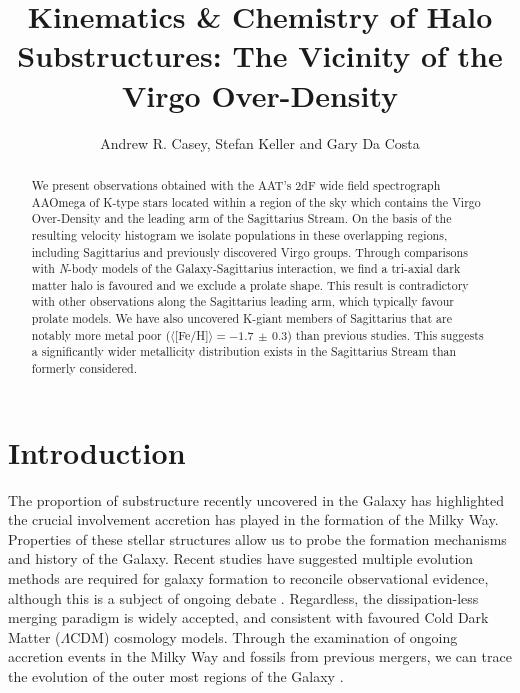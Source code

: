 \documentclass[preprint2]{aastex}
\begin{document}
\title{Kinematics \& Chemistry of Halo Substructures: The Vicinity of the Virgo Over-Density}

\author{Andrew R. Casey, Stefan Keller and Gary Da Costa}
		
	
\begin{abstract}
We present observations obtained with the AAT's 2dF wide field spectrograph AAOmega of K-type stars located within a region of the sky which contains the Virgo Over-Density and the leading arm of the Sagittarius Stream.  On the basis of the resulting velocity histogram we isolate populations in these overlapping regions, including Sagittarius and previously discovered Virgo groups. Through comparisons with \textit{N}-body models of the Galaxy-Sagittarius interaction, we find a tri-axial dark matter halo is favoured and we exclude a prolate shape. This result is contradictory with other observations along the Sagittarius leading arm, which typically favour prolate models.  We have also uncovered K-giant members of Sagittarius that are notably more metal poor ($\langle[$Fe/H$]\rangle = -1.7\,\pm\,0.3$) than previous studies. This suggests a significantly wider metallicity distribution exists in the Sagittarius Stream than formerly considered.
\end{abstract}



\section{Introduction}
\label{sec:introduction}

The proportion of substructure recently uncovered in the Galaxy has highlighted the crucial involvement accretion has played in the formation of the Milky Way. Properties of these stellar structures allow us to probe the formation mechanisms and history of the Galaxy. Recent studies \citep{Carollo;et-al_2007, Carollo;et-al_2010} have suggested multiple evolution methods are required for galaxy formation to reconcile observational evidence, although this is a subject of ongoing debate \citep{Schoenrich;et-al_2010}. Regardless, the dissipation-less merging paradigm is widely accepted, and consistent with favoured Cold Dark Matter ($\Lambda$CDM) cosmology models. Through the examination of ongoing accretion events in the Milky Way and fossils from previous mergers, we can trace the evolution of the outer most regions of the Galaxy \citep[][e.g. ]{Helmi;White_2001}.
\end{document}
